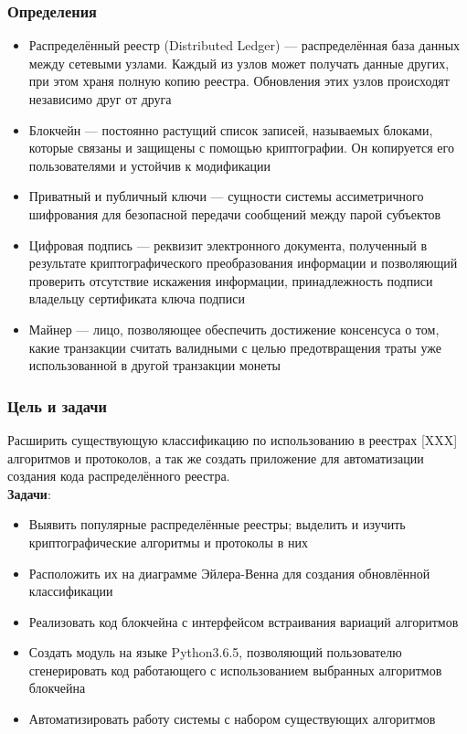 \documentclass{beamer}
\begin{document}
\begin{frame}
\frametitle{Определения}
\begin{itemize}
\scriptsize
    \item Распределённый реестр (Distributed Ledger) --- распределённая база
          данных между сетевыми узлами. Каждый из узлов может получать данные
          других, при этом храня полную копию реестра.  Обновления этих
          узлов происходят независимо друг от друга
    \item Блокчейн --- постоянно растущий список записей, называемых блоками,
          которые связаны и защищены с помощью криптографии. Он копируется его
          пользователями и устойчив к модификации
    \item Приватный и публичный ключи --- сущности системы ассиметричного
          шифрования для безопасной передачи сообщений между парой субъектов
    \item Цифровая подпись --- реквизит электронного документа, полученный в
          результате криптографического преобразования информации и позволяющий
          проверить отсутствие искажения информации, принадлежность
          подписи владельцу сертификата ключа подписи
    \item Майнер --- лицо, позволяющее обеспечить достижение консенсуса о том,
          какие транзакции считать валидными с целью предотвращения траты уже
          использованной в другой транзакции монеты
\end{itemize}
\end{frame}

\begin{frame}[c]
    \small
    \frametitle{Цель и задачи}
    Расширить существующую классификацию по использованию в реестрах
    [XXX] алгоритмов и протоколов, а так же создать приложение для
    автоматизации создания кода распределённого реестра.\\

    {\bfseries \color{HSEblue} Задачи}:
    \begin{itemize}
        \item Выявить популярные распределённые реестры; выделить и изучить
              криптографические алгоритмы и протоколы в них
        \item Расположить их на диаграмме Эйлера-Венна для создания обновлённой
              классификации
        \item Реализовать код блокчейна с интерфейсом встраивания вариаций
              алгоритмов
        \item Создать модуль на языке Python3.6.5, позволяющий пользователю
              сгенерировать код работающего с использованием выбранных
              алгоритмов блокчейна
        \item Автоматизировать работу системы с набором существующих алгоритмов
    \end{itemize}
\end{frame}
\end{document}
